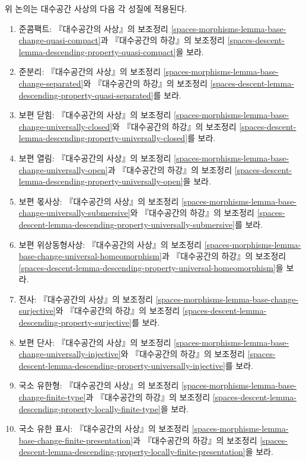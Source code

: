 \medskip\noindent
위 논의는 대수공간 사상의 다음 각 성질에 적용된다.
\begin{enumerate}
\item 준콤팩트: 『대수공간의 사상』의 보조정리
\ref{spaces-morphisms-lemma-base-change-quasi-compact}과
『대수공간의 하강』의 보조정리
\ref{spaces-descent-lemma-descending-property-quasi-compact}을 보라.
\item 준분리: 『대수공간의 사상』의 보조정리
\ref{spaces-morphisms-lemma-base-change-separated}와
『대수공간의 하강』의 보조정리
\ref{spaces-descent-lemma-descending-property-quasi-separated}를 보라.
\item 보편 닫힘: 『대수공간의 사상』의 보조정리
\ref{spaces-morphisms-lemma-base-change-universally-closed}와
『대수공간의 하강』의 보조정리
\ref{spaces-descent-lemma-descending-property-universally-closed}를 보라.
\item 보편 열림: 『대수공간의 사상』의 보조정리
\ref{spaces-morphisms-lemma-base-change-universally-open}과
『대수공간의 하강』의 보조정리
\ref{spaces-descent-lemma-descending-property-universally-open}을 보라.
\item 보편 몫사상: 『대수공간의 사상』의 보조정리
\ref{spaces-morphisms-lemma-base-change-universally-submersive}와
『대수공간의 하강』의 보조정리
\ref{spaces-descent-lemma-descending-property-universally-submersive}를 보라.
\item 보편 위상동형사상: 『대수공간의 사상』의 보조정리
\ref{spaces-morphisms-lemma-base-change-universal-homeomorphism}과
『대수공간의 하강』의 보조정리
\ref{spaces-descent-lemma-descending-property-universal-homeomorphism}을 보라.
\item 전사: 『대수공간의 사상』의 보조정리
\ref{spaces-morphisms-lemma-base-change-surjective}와
『대수공간의 하강』의 보조정리
\ref{spaces-descent-lemma-descending-property-surjective}를 보라.
\item 보편 단사: 『대수공간의 사상』의 보조정리
\ref{spaces-morphisms-lemma-base-change-universally-injective}와
『대수공간의 하강』의 보조정리
\ref{spaces-descent-lemma-descending-property-universally-injective}를 보라.
\item 국소 유한형: 『대수공간의 사상』의 보조정리
\ref{spaces-morphisms-lemma-base-change-finite-type}과
『대수공간의 하강』의 보조정리
\ref{spaces-descent-lemma-descending-property-locally-finite-type}을 보라.
\item 국소 유한 표시: 『대수공간의 사상』의 보조정리
\ref{spaces-morphisms-lemma-base-change-finite-presentation}과
『대수공간의 하강』의 보조정리
\ref{spaces-descent-lemma-descending-property-locally-finite-presentation}을 보라.

\end{enumerate}
